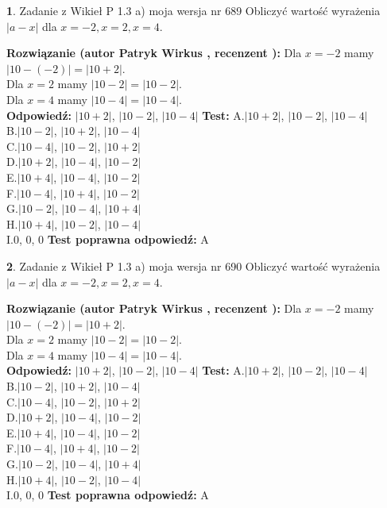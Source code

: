 \documentclass[12pt, a4paper]{article}
\theoremstyle{definition} %
\newtheorem{zad}{}
\newcommand{\zadStart}[1]{\begin{zad}#1\newline}
\newcommand{\zadStop}{\end{zad}}
\newcommand{\rozwStart}[2]{\noindent \textbf{Rozwiązanie (autor #1 , recenzent #2): }\newline}
\newcommand{\rozwStop}{\newline}
\newcommand{\odpStart}{\noindent \textbf{Odpowiedź:}\newline}
\newcommand{\odpStop}{\newline}
\newcommand{\testStart}{\noindent \textbf{Test:}\newline}
\newcommand{\testStop}{\newline}
\newcommand{\kluczStart}{\noindent \textbf{Test poprawna odpowiedź:}\newline}
\newcommand{\kluczStop}{\newline}
\begin{document}
\zadStart{Zadanie z Wikieł P 1.3 a) moja wersja nr 689}
Obliczyć wartość wyrażenia $|a - x|$ dla $x=-2,x=2,x=4$.
\zadStop
\rozwStart{Patryk Wirkus}{}
Dla $x = -2$ mamy $|10 - (-2)| = |10 + 2|$.\\
Dla $x = 2$ mamy $|10 - 2| = |10 - 2|$.\\
Dla $x = 4$ mamy $|10 - 4| = |10 - 4|$.\\
\rozwStop
\odpStart
$|10 + 2|$, $|10 - 2|$, $|10 - 4|$
\odpStop
\testStart
A.$|10 + 2|$, $|10 - 2|$, $|10 - 4|$\\
B.$|10 - 2|$, $|10 + 2|$, $|10 - 4|$\\
C.$|10 - 4|$, $|10 - 2|$, $|10 + 2|$\\
D.$|10 + 2|$, $|10 - 4|$, $|10 - 2|$\\
E.$|10 + 4|$, $|10 - 4|$, $|10 - 2|$\\
F.$|10 - 4|$, $|10 + 4|$, $|10 - 2|$\\
G.$|10 - 2|$, $|10 - 4|$, $|10 + 4|$\\
H.$|10 + 4|$, $|10 - 2|$, $|10 - 4|$\\
I.$0$, $0$, $0$
\testStop
\kluczStart
A
\kluczStop



\zadStart{Zadanie z Wikieł P 1.3 a) moja wersja nr 690}
Obliczyć wartość wyrażenia $|a - x|$ dla $x=-2,x=2,x=4$.
\zadStop
\rozwStart{Patryk Wirkus}{}
Dla $x = -2$ mamy $|10 - (-2)| = |10 + 2|$.\\
Dla $x = 2$ mamy $|10 - 2| = |10 - 2|$.\\
Dla $x = 4$ mamy $|10 - 4| = |10 - 4|$.\\
\rozwStop
\odpStart
$|10 + 2|$, $|10 - 2|$, $|10 - 4|$
\odpStop
\testStart
A.$|10 + 2|$, $|10 - 2|$, $|10 - 4|$\\
B.$|10 - 2|$, $|10 + 2|$, $|10 - 4|$\\
C.$|10 - 4|$, $|10 - 2|$, $|10 + 2|$\\
D.$|10 + 2|$, $|10 - 4|$, $|10 - 2|$\\
E.$|10 + 4|$, $|10 - 4|$, $|10 - 2|$\\
F.$|10 - 4|$, $|10 + 4|$, $|10 - 2|$\\
G.$|10 - 2|$, $|10 - 4|$, $|10 + 4|$\\
H.$|10 + 4|$, $|10 - 2|$, $|10 - 4|$\\
I.$0$, $0$, $0$
\testStop
\kluczStart
A
\kluczStop
\end{document}
